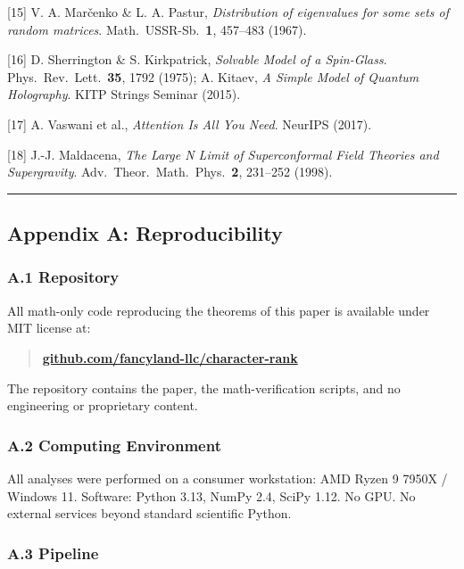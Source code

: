 \documentclass[
  11pt,
]{article}
\begin{document}
{[}15{]} V. A. Marčenko \& L. A. Pastur, \emph{Distribution of
eigenvalues for some sets of random matrices}.
Math.~USSR-Sb.~\textbf{1}, 457--483 (1967).

{[}16{]} D. Sherrington \& S. Kirkpatrick, \emph{Solvable Model of a
Spin-Glass}. Phys.~Rev.~Lett.~\textbf{35}, 1792 (1975); A. Kitaev,
\emph{A Simple Model of Quantum Holography}. KITP Strings Seminar
(2015).

{[}17{]} A. Vaswani et al., \emph{Attention Is All You Need}. NeurIPS
(2017).

{[}18{]} J.-J. Maldacena, \emph{The Large N Limit of Superconformal
Field Theories and Supergravity}. Adv.~Theor.~Math.~Phys.~\textbf{2},
231--252 (1998).

\begin{center}\rule{0.5\linewidth}{0.5pt}\end{center}

\subsection{Appendix A:
Reproducibility}\label{appendix-a-reproducibility}

\subsubsection{A.1 Repository}\label{a.1-repository}

All math-only code reproducing the theorems of this paper is available
under MIT license at:

\begin{quote}
\textbf{\href{https://github.com/fancyland-llc/character-rank}{github.com/fancyland-llc/character-rank}}
\end{quote}

The repository contains the paper, the math-verification scripts, and no
engineering or proprietary content.

\subsubsection{A.2 Computing
Environment}\label{a.2-computing-environment}

All analyses were performed on a consumer workstation: AMD Ryzen 9 7950X
/ Windows 11. Software: Python 3.13, NumPy 2.4, SciPy 1.12. No GPU. No
external services beyond standard scientific Python.

\subsubsection{A.3 Pipeline}\label{a.3-pipeline}
\end{document}
